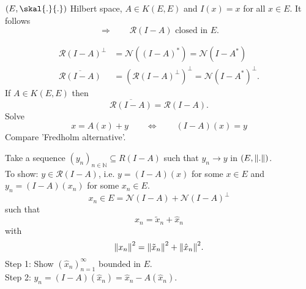 \begin{beispiel}
	$(E,\skal{.}{.})$ Hilbert space, $A \in K(E,E)$ and $I(x)=x$ for all $x \in E$. It follows
	\[
		\Rightarrow  \qquad \mathcal{R}(I-A) \text{ closed in $E$}.
	\]
\begin{bemerkung}
	\begin{align*}
		\mathcal{R}(I-A)^{\perp} &= \mathcal{N}((I-A)^{*}) = \mathcal{N}(I-A^{*}) \\
		\overline{\mathcal{R}(I-A)} &= \left( \mathcal{R}(I-A)^{\perp} \right)^{\perp} = \mathcal{N}(I-A^{*})^{\perp}.
	\end{align*}
	If $A \in K(E,E)$ then
	\[
		\overline{\mathcal{R}(I-A)} = \mathcal{R}(I-A).
	\]
	Solve \[
		x = A(x) + y \qquad \Leftrightarrow \qquad (I-A)(x) = y
	\]
	Compare 'Fredholm alternative'.
\end{bemerkung}
\end{beispiel}
\begin{beweis}
	Take a sequence $(y_n)_{n \in \mathbb{N}} \subseteq R(I-A)$ such that $y_n \to y$ in $(E,\norm{.})$. \\
	To show: $y \in \mathcal{R}(I-A)$, i.e. $y = (I-A)(x)$ for some $x \in E$ and $y_n = (I-A)(x_n)$ for some $x_n \in E$.
	\[
		x_n \in E = \mathcal{N}(I-A) + \mathcal{N}(I-A)^{\perp}
	\]
	such that
	\[
		x_n = \tilde x_n + \hat x_n 
	\]
	with
	\[
		\norm{x_n}^2 = \norm{\tilde x_n}^2 + \norm{\hat x_n}^2.
	\]
	Step 1: Show $(\hat x_n)_{n=1}^{\infty}$ bounded in $E$. \\
	Step 2: $y_n = (I-A)( \hat x_n) = \hat x_n - A( \hat x_n)$. \\
\end{beweis}